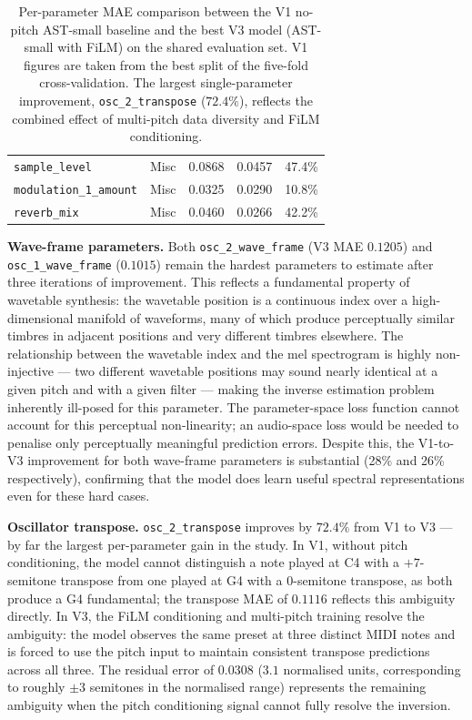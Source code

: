 \begin{table}[H]
\begin{tabular}{llccc}
\hline
\texttt{sample\_level}           & Misc       & 0.0868 & 0.0457 & 47.4\% \\
\texttt{modulation\_1\_amount}   & Misc       & 0.0325 & 0.0290 & 10.8\% \\
\texttt{reverb\_mix}             & Misc       & 0.0460 & 0.0266 & 42.2\% \\
\hline
\end{tabular}
\vspace{0.3cm}
\caption{Per-parameter MAE comparison between the V1 no-pitch AST-small baseline and the best V3 model (AST-small with FiLM) on the shared evaluation set. V1 figures are taken from the best split of the five-fold cross-validation. The largest single-parameter improvement, \texttt{osc\_2\_transpose} ($72.4\%$), reflects the combined effect of multi-pitch data diversity and FiLM conditioning.}
\label{tab:per_param_full}
\end{table}

\noindent
\textbf{Wave-frame parameters.} Both \texttt{osc\_2\_wave\_frame} (V3 MAE $0.1205$) and \texttt{osc\_1\_wave\_frame} ($0.1015$) remain the hardest parameters to estimate after three iterations of improvement. This reflects a fundamental property of wavetable synthesis: the wavetable position is a continuous index over a high-dimensional manifold of waveforms, many of which produce perceptually similar timbres in adjacent positions and very different timbres elsewhere. The relationship between the wavetable index and the mel spectrogram is highly non-injective — two different wavetable positions may sound nearly identical at a given pitch and with a given filter — making the inverse estimation problem inherently ill-posed for this parameter. The parameter-space loss function cannot account for this perceptual non-linearity; an audio-space loss would be needed to penalise only perceptually meaningful prediction errors. Despite this, the V1-to-V3 improvement for both wave-frame parameters is substantial (28\% and 26\% respectively), confirming that the model does learn useful spectral representations even for these hard cases.

\noindent \newline
\textbf{Oscillator transpose.} \texttt{osc\_2\_transpose} improves by $72.4\%$ from V1 to V3 — by far the largest per-parameter gain in the study. In V1, without pitch conditioning, the model cannot distinguish a note played at C4 with a $+7$-semitone transpose from one played at G4 with a $0$-semitone transpose, as both produce a G4 fundamental; the transpose MAE of $0.1116$ reflects this ambiguity directly. In V3, the FiLM conditioning and multi-pitch training resolve the ambiguity: the model observes the same preset at three distinct MIDI notes and is forced to use the pitch input to maintain consistent transpose predictions across all three. The residual error of $0.0308$ ($3.1$ normalised units, corresponding to roughly $\pm 3$ semitones in the normalised range) represents the remaining ambiguity when the pitch conditioning signal cannot fully resolve the inversion.

